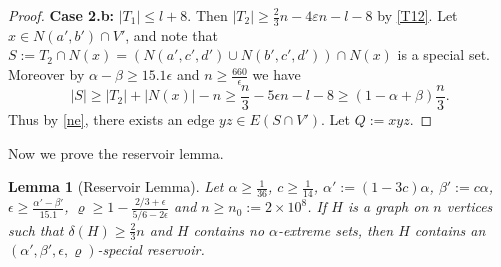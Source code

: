\documentclass[oneside,12pt]{memoir}
\newtheorem{lemma}[theorem]{Lemma}
\newcommand{\ep}{\epsilon}
\newcommand{\n}{2\times 10^8}
\begin{document}
\begin{proof}
\noindent \textbf{Case 2.b:} $|T_{1}|\le l+8$. Then $|T_{2}|\geq\frac{2}{3}n-4\varepsilon n-l-8$ by \eqref{T12}.
Let $x\in N(a',b')\cap V'$, and note that $S:=T_{2}\cap N(x)=(N(a',c',d')\cup N(b',c',d'))\cap N(x)$
is a special set. Moreover by $\alpha-\beta\ge15.1\ep$ and $n\geq \frac{660}{\ep}$ we have\[
|S|\ge|T_{2}|+|N(x)|-n\ge\frac{n}{3}-5\ep n-l-8\ge(1-\alpha+\beta)\frac{n}{3}.\]
Thus by \eqref{ne}, there exists an edge $yz\in E(S\cap V')$. Let
$Q:=xyz$.

\noindent 
\end{proof}

Now we prove the reservoir lemma.

\begin{lemma}[Reservoir Lemma] \label{reservoir} 
Let $\alpha\geq \frac{1}{36}$, $c\geq\frac{1}{14}$,  $\alpha':=(1-3c)\alpha$, $\beta':=c\alpha$, $\ep\geq \frac{\alpha'-\beta'}{15.1}$, $\varrho\geq %
1-\frac{2/3+\ep}{5/6-2\ep}$ and $n\geq n_{0}:=\n$. If $H$ is a
graph on $n$ vertices such that $\delta(H)\geq \frac{2}{3}n$ and $H$ contains 
no $\alpha$-extreme sets, then $H$ contains an $(\alpha', \beta', \ep, \varrho)$-special
reservoir. \end{lemma}
\end{document}
